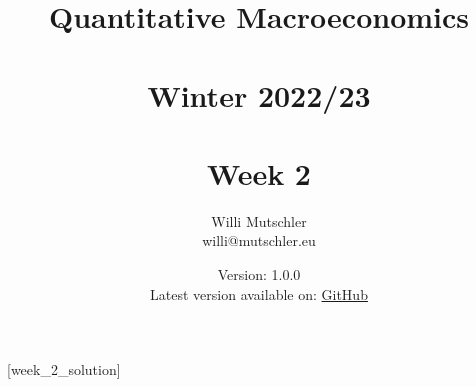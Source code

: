 
\newif\ifDisplaySolutions%


\title{Quantitative Macroeconomics\\~\\Winter 2022/23\\~\\Week 2}
\author{Willi Mutschler\\willi@mutschler.eu}
\date{Version: 1.0.0\\Latest version available on: \href{https://github.com/wmutschl/Quantitative-Macroeconomics/releases/latest/download/week2.pdf}{GitHub}}
\maketitle\thispagestyle{empty}

\newpage
{}[week_2_solution]
\tableofcontents\thispagestyle{empty}\newpage

\setcounter{page}{1}
\newpage
\newpage
\newpage
\newpage
\newpage
\printbibliography
\newpage

\ifDisplaySolutions
\newpage
\appendix
\section{Solutions}

\fi
